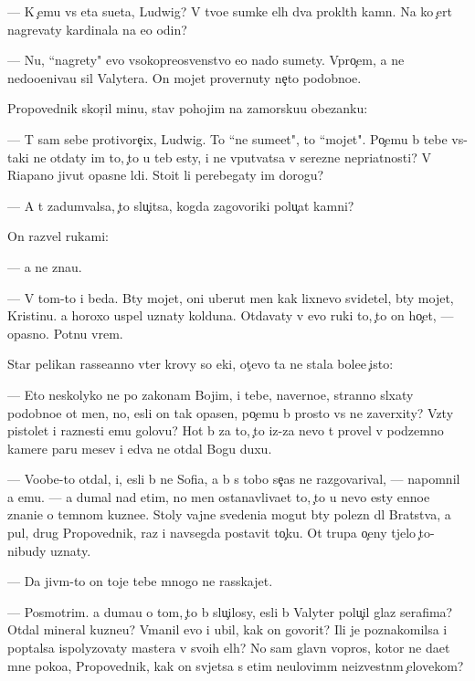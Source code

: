\documentclass[10pt]{book}
\begin{document}
— K {\c}emu vs{\ia} eta su{\y}eta, Ludwig? V tvo{\y}e{\y} sumke {\q}el{\yi}h dva prokl{\ia}t{\yi}h kamn{\ia}. Na ko{\y} {\c}ert nagrevaty kardinala na {\y}e{\x}o odin?

— Nu, ``nagrety" {\y}evo v{\yi}sokopreosv{\ia}{\x}enstvo {\y}e{\x}o nado sumety. Vpro{\c}em, {\y}a ne nedoo{\q}eniva{\y}u sil{\yi} Valytera. On mojet provernuty ne{\c}to podobno{\y}e.

Propovednik skor{\c}il minu, stav pohojim na zamorsku{\y}u obez{\y}anku:

— T{\yi} sam sebe protivore{\c}ix, Ludwig. To ``ne sume{\y}et", to ``mojet". Po{\c}emu b{\yi} tebe vs{\e}-taki ne otdaty im to, {\c}to u teb{\ia} {\y}esty, i ne vput{\yi}vatsa v ser{\y}ezn{\yi}{\y}e nepri{\y}atnosti? V Riapano jivut opasn{\yi}{\y}e l{\iu}di. Sto{\y}it li perebegaty im dorogu?

— A t{\yi} zadum{\yi}valsa, {\c}to slu{\c}itsa, kogda zagovor{\x}iki polu{\c}at kamni?

On razvel rukami:

— {\Y}a ne zna{\y}u.

— V tom-to i beda. B{\yi}ty mojet, oni uberut men{\ia} kak lixnevo svidetel{\ia}, b{\yi}ty mojet, Kristinu. {\Y}a horoxo uspel uznaty kolduna. Otdavaty v {\y}evo ruki to, {\c}to on ho{\c}et, — opasno. Pot{\ia}nu vrem{\ia}.

Star{\yi}{\y} pelikan rasse{\y}anno v{\yi}ter krovy so {\x}eki, ot{\c}evo ta ne stala bole{\y}e {\c}isto{\y}:

— Eto neskolyko ne po zakonam Boj{\yf}im, i tebe, naverno{\y}e, stranno sl{\yi}xaty podobno{\y}e ot men{\ia}, no, {\y}esli on tak opasen, po{\c}emu b{\yi} prosto vs{\e} ne zaverxity? Vz{\ia}ty pistolet i raznesti {\y}emu golovu? Hot{\ia} b{\yi} za to, {\c}to iz-za nevo t{\yi} provel v podzemno{\y} kamere paru mes{\ia}{\q}ev i {\y}edva ne otdal Bogu duxu.

— Voob{\x}e-to otdal, i, {\y}esli b{\yi} ne Sofi{\y}a, {\y}a b{\yi} s tobo{\y} se{\y}{\c}as ne razgovarival, — napomnil {\y}a {\y}emu. — {\Y}a dumal nad etim, no men{\ia} ostanavliva{\y}et to, {\c}to u nevo {\y}esty {\q}enno{\y}e znani{\y}e o temnom kuzne{\q}e. Stoly vajn{\yi}{\y}e svedeni{\y}a mogut b{\yi}ty polezn{\yi} dl{\ia} Bratstva, a pul{\ia}, drug Propovednik, raz i navsegda postavit to{\c}ku. Ot trupa o{\c}eny t{\ia}jelo {\c}to-nibudy uznaty.

— Da jiv{\yi}m-to on toje tebe mnogo ne rasskajet.

— Posmotrim. {\Y}a duma{\y}u o tom, {\c}to b{\yi} slu{\c}ilosy, {\y}esli b{\yi} Valyter polu{\c}il glaz serafima? Otdal mineral kuzne{\q}u? V{\yi}manil {\y}evo i ubil, kak on govorit? Ili je poznakomilsa i pop{\yi}talsa ispolyzovaty mastera v svo{\y}ih {\q}el{\ia}h? No sam{\yi}{\y} glavn{\yi}{\y} vopros, kotor{\yi}{\y} ne da{\y}et mne poko{\y}a, Propovednik, kak on sv{\ia}jetsa s etim neulovim{\yi}m ne{\y}izvestn{\yi}m {\c}elovekom?
\end{document}
